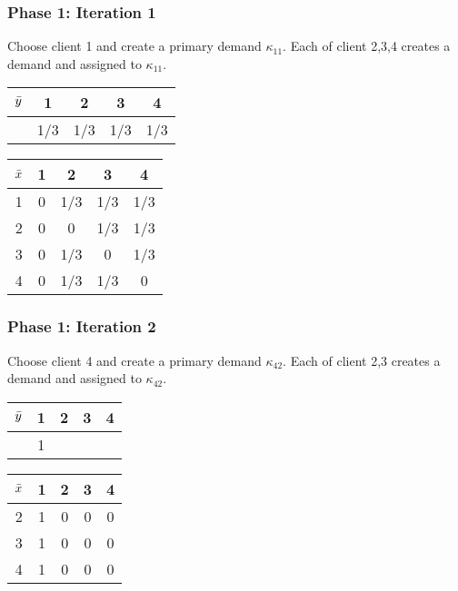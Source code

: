 \documentclass[hyperref, xcolor=dvipsnames]{beamer}
\begin{document}
\begin{frame}
  \frametitle{Phase 1: Iteration 1} 

  Choose client 1 and create a primary demand $\kappa_{11}$. Each of
  client 2,3,4 creates a demand and assigned to $\kappa_{11}$.
  \begin{table}
  \begin{subtable}{0.5\textwidth}
    \centering
    \begin{tabular}{c | c c c c}
      ${\bar y}$ & 1 & 2 & 3 & 4\\
      \hline
      & 1/3 & 1/3 & 1/3 & 1/3\\
    \end{tabular}
  \end{subtable}
%
  \begin{subtable}{0.5\textwidth}
    \centering
    \begin{tabular}{c | c c c c}
      ${\bar x}$ & 1 & 2 & 3 & 4\\
      \hline
      1 & 0 & 1/3 & 1/3 & 1/3\\
      2 & 0 & 0 & 1/3 & 1/3\\
      3 & 0 & 1/3 & 0 & 1/3\\
      4 & 0 & 1/3 & 1/3 & 0\\
    \end{tabular}
  \end{subtable}
\end{table}
\end{frame}

\begin{frame}
  \frametitle{Phase 1: Iteration 2}

  Choose client 4 and create a primary demand $\kappa_{42}$. Each of
  client 2,3 creates a demand and assigned to $\kappa_{42}$.
  \begin{table}
  \begin{subtable}{0.5\textwidth}
    \centering
    \begin{tabular}{c | c c c c}
      ${\bar y}$ & 1 & 2 & 3 & 4\\
      \hline
      & 1 &  &  & \\
    \end{tabular}
  \end{subtable}
%
  \begin{subtable}{0.5\textwidth}
    \centering
    \begin{tabular}{c | c c c c}
      ${\bar x}$ & 1 & 2 & 3 & 4\\
      \hline
      2 & 1 & 0 & 0 & 0\\
      3 & 1 & 0 & 0 & 0\\
      4 & 1 & 0 & 0 & 0\\
    \end{tabular}
  \end{subtable}
\end{table}
\end{frame}
\end{document}
